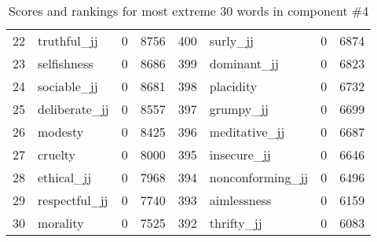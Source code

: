\begin{table}[tbp]
\begin{tabular}{| rlr@{.}l | rlr@{.}l |}
    22 & truthful\_jj & 0 & 8756    &    400 & surly\_jj & 0 & 6874 \\
    23 & selfishness & 0 & 8686    &    399 & dominant\_jj & 0 & 6823 \\
    24 & sociable\_jj & 0 & 8681    &    398 & placidity & 0 & 6732 \\
    25 & deliberate\_jj & 0 & 8557    &    397 & grumpy\_jj & 0 & 6699 \\
    26 & modesty & 0 & 8425    &    396 & meditative\_jj & 0 & 6687 \\
    27 & cruelty & 0 & 8000    &    395 & insecure\_jj & 0 & 6646 \\
    28 & ethical\_jj & 0 & 7968    &    394 & nonconforming\_jj & 0 & 6496 \\
    29 & respectful\_jj & 0 & 7740    &    393 & aimlessness & 0 & 6159 \\
    30 & morality & 0 & 7525    &    392 & thrifty\_jj & 0 & 6083 \\
    \hline
    \end{tabular}
    \caption{Scores and rankings for most extreme 30 words in component \#4} 
\end{table}
\clearpage
